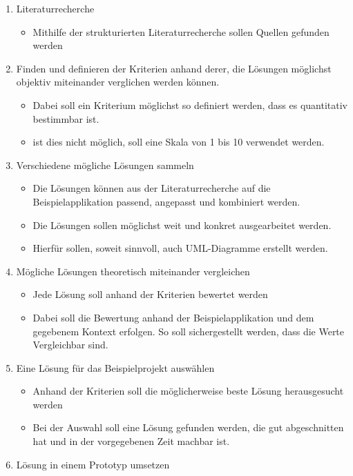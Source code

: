 \begin{enumerate}
  \item Literaturrecherche
  \begin{itemize}
    \item Mithilfe der strukturierten Literaturrecherche sollen Quellen gefunden werden
  \end{itemize}
\item
  Finden und definieren der Kriterien anhand derer, die Lösungen möglichst objektiv
  miteinander verglichen werden können.

  \begin{itemize}
  \item
    Dabei soll ein Kriterium möglichst so definiert werden, dass es
    quantitativ bestimmbar ist.
  \item
    ist dies nicht möglich, soll eine Skala von 1 bis 10 verwendet
    werden.
  \end{itemize}
\item
  Verschiedene mögliche Lösungen sammeln

  \begin{itemize}
    \item Die Lösungen können aus der Literaturrecherche auf die Beispielapplikation passend, angepasst und kombiniert werden.
  \item
    Die Lösungen sollen möglichst weit und konkret ausgearbeitet werden.
  \item
    Hierfür sollen, soweit sinnvoll, auch UML-Diagramme erstellt werden.
  \end{itemize}
\item
  Mögliche Lösungen theoretisch miteinander vergleichen

  \begin{itemize}
  \item
    Jede Lösung soll anhand der Kriterien bewertet werden
  \item
    Dabei soll die Bewertung anhand der Beispielapplikation und dem
    gegebenem Kontext erfolgen.
    So soll sichergestellt werden, dass die
    Werte Vergleichbar sind.
  \end{itemize}
\item Eine Lösung für das Beispielprojekt auswählen

  \begin{itemize}
  \item
    Anhand der Kriterien soll die möglicherweise beste Lösung herausgesucht werden
    \item Bei der Auswahl soll eine Lösung gefunden werden, die gut abgeschnitten hat und in der vorgegebenen Zeit machbar ist.
  \end{itemize}
\item
  Lösung in einem Prototyp umsetzen


\end{enumerate}
